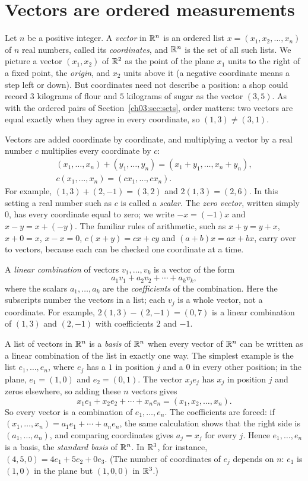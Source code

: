 \section{Vectors are ordered measurements}\label{ch10:sec:vectors}
Let $n$ be a positive integer. A \emph{vector} in $\mathbb R^n$ is an ordered list $x=(x_1,x_2,\ldots,x_n)$ of $n$ real numbers, called its \emph{coordinates}, and $\mathbb R^n$ is the set of all such lists. We picture a vector $(x_1,x_2)$ of $\mathbb R^2$ as the point of the plane $x_1$ units to the right of a fixed point, the \emph{origin}, and $x_2$ units above it (a negative coordinate means a step left or down). But coordinates need not describe a position: a shop could record $3$ kilograms of flour and $5$ kilograms of sugar as the vector $(3,5)$. As with the ordered pairs of Section~\ref{ch03:sec:sets}, order matters: two vectors are equal exactly when they agree in every coordinate, so $(1,3)\ne(3,1)$.

Vectors are added coordinate by coordinate, and multiplying a vector by a real number $c$ multiplies every coordinate by $c$:
\begin{gather*}
(x_1,\ldots,x_n)+(y_1,\ldots,y_n)=(x_1+y_1,\ldots,x_n+y_n),\\
c(x_1,\ldots,x_n)=(cx_1,\ldots,cx_n).
\end{gather*}
For example, $(1,3)+(2,-1)=(3,2)$ and $2(1,3)=(2,6)$. In this setting a real number such as $c$ is called a \emph{scalar}. The \emph{zero vector}, written simply $0$, has every coordinate equal to zero; we write $-x=(-1)x$ and $x-y=x+(-y)$. The familiar rules of arithmetic, such as $x+y=y+x$, $x+0=x$, $x-x=0$, $c(x+y)=cx+cy$ and $(a+b)x=ax+bx$, carry over to vectors, because each can be checked one coordinate at a time.

A \emph{linear combination} of vectors $v_1,\ldots,v_k$ is a vector of the form
\[
a_1v_1+a_2v_2+\cdots+a_kv_k,
\]
where the scalars $a_1,\ldots,a_k$ are the \emph{coefficients} of the combination. Here the subscripts number the vectors in a list; each $v_j$ is a whole vector, not a coordinate. For example, $2(1,3)-(2,-1)=(0,7)$ is a linear combination of $(1,3)$ and $(2,-1)$ with coefficients $2$ and $-1$.

A list of vectors in $\mathbb R^n$ is a \emph{basis} of $\mathbb R^n$ when every vector of $\mathbb R^n$ can be written as a linear combination of the list in exactly one way. The simplest example is the list $e_1,\ldots,e_n$, where $e_j$ has a $1$ in position $j$ and a $0$ in every other position; in the plane, $e_1=(1,0)$ and $e_2=(0,1)$. The vector $x_je_j$ has $x_j$ in position $j$ and zeros elsewhere, so adding these $n$ vectors gives
\[
x_1e_1+x_2e_2+\cdots+x_ne_n=(x_1,x_2,\ldots,x_n).
\]
So every vector is a combination of $e_1,\ldots,e_n$. The coefficients are forced: if $(x_1,\ldots,x_n)=a_1e_1+\cdots+a_ne_n$, the same calculation shows that the right side is $(a_1,\ldots,a_n)$, and comparing coordinates gives $a_j=x_j$ for every $j$. Hence $e_1,\ldots,e_n$ is a basis, the \emph{standard basis} of $\mathbb R^n$. In $\mathbb R^3$, for instance, $(4,5,0)=4e_1+5e_2+0e_3$. (The number of coordinates of $e_j$ depends on $n$: $e_1$ is $(1,0)$ in the plane but $(1,0,0)$ in $\mathbb R^3$.)

